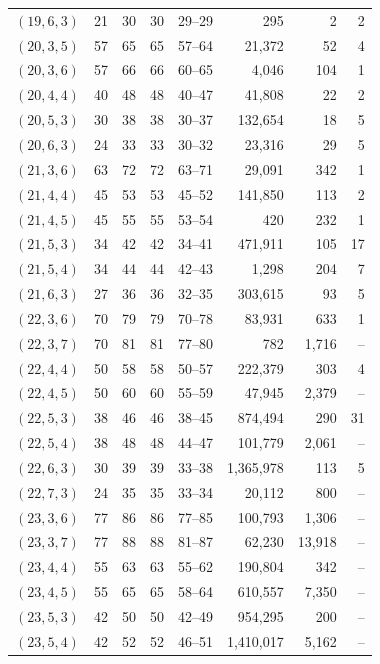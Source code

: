 {\begin{longtable}{lrrrrrrr}
$(19,6,3)$ & 21 & 30 & 30 & 29--29 & 295 & 2 & 2 \\
$(20,3,5)$ & 57 & 65 & 65 & 57--64 & 21{,}372 & 52 & 4 \\
$(20,3,6)$ & 57 & 66 & 66 & 60--65 & 4{,}046 & 104 & 1 \\
$(20,4,4)$ & 40 & 48 & 48 & 40--47 & 41{,}808 & 22 & 2 \\
$(20,5,3)$ & 30 & 38 & 38 & 30--37 & 132{,}654 & 18 & 5 \\
$(20,6,3)$ & 24 & 33 & 33 & 30--32 & 23{,}316 & 29 & 5 \\
$(21,3,6)$ & 63 & 72 & 72 & 63--71 & 29{,}091 & 342 & 1 \\
$(21,4,4)$ & 45 & 53 & 53 & 45--52 & 141{,}850 & 113 & 2 \\
$(21,4,5)$ & 45 & 55 & 55 & 53--54 & 420 & 232 & 1 \\
$(21,5,3)$ & 34 & 42 & 42 & 34--41 & 471{,}911 & 105 & 17 \\
$(21,5,4)$ & 34 & 44 & 44 & 42--43 & 1{,}298 & 204 & 7 \\
$(21,6,3)$ & 27 & 36 & 36 & 32--35 & 303{,}615 & 93 & 5 \\
$(22,3,6)$ & 70 & 79 & 79 & 70--78 & 83{,}931 & 633 & 1 \\
$(22,3,7)$ & 70 & 81 & 81 & 77--80 & 782 & 1{,}716 & -- \\
$(22,4,4)$ & 50 & 58 & 58 & 50--57 & 222{,}379 & 303 & 4 \\
$(22,4,5)$ & 50 & 60 & 60 & 55--59 & 47{,}945 & 2{,}379 & -- \\
$(22,5,3)$ & 38 & 46 & 46 & 38--45 & 874{,}494 & 290 & 31 \\
$(22,5,4)$ & 38 & 48 & 48 & 44--47 & 101{,}779 & 2{,}061 & -- \\
$(22,6,3)$ & 30 & 39 & 39 & 33--38 & 1{,}365{,}978 & 113 & 5 \\
$(22,7,3)$ & 24 & 35 & 35 & 33--34 & 20{,}112 & 800 & -- \\
$(23,3,6)$ & 77 & 86 & 86 & 77--85 & 100{,}793 & 1{,}306 & -- \\
$(23,3,7)$ & 77 & 88 & 88 & 81--87 & 62{,}230 & 13{,}918 & -- \\
$(23,4,4)$ & 55 & 63 & 63 & 55--62 & 190{,}804 & 342 & -- \\
$(23,4,5)$ & 55 & 65 & 65 & 58--64 & 610{,}557 & 7{,}350 & -- \\
$(23,5,3)$ & 42 & 50 & 50 & 42--49 & 954{,}295 & 200 & -- \\
$(23,5,4)$ & 42 & 52 & 52 & 46--51 & 1{,}410{,}017 & 5{,}162 & -- \\

\end{longtable}}
